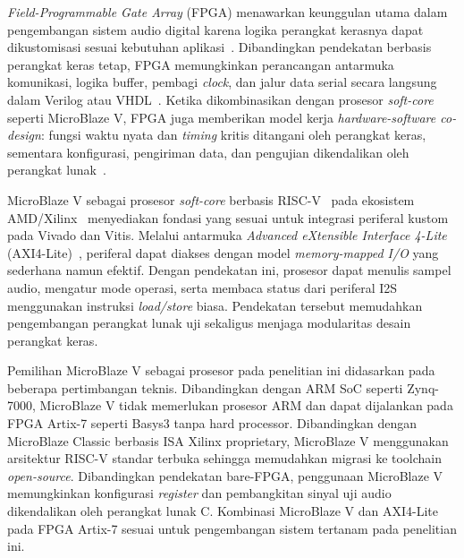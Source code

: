 \hspace{1cm}\textit{Field-Programmable Gate Array} (FPGA) menawarkan keunggulan utama dalam pengembangan sistem audio digital karena logika perangkat kerasnya dapat dikustomisasi sesuai kebutuhan aplikasi~\citep{trimberger_history_fpga_2018}. Dibandingkan pendekatan berbasis perangkat keras tetap, FPGA memungkinkan perancangan antarmuka komunikasi, logika buffer, pembagi \textit{clock}, dan jalur data serial secara langsung dalam Verilog atau VHDL~\citep{palnitkar_verilog_2003}. Ketika dikombinasikan dengan prosesor \textit{soft-core} seperti MicroBlaze V, FPGA juga memberikan model kerja \textit{hardware-software co-design}: fungsi waktu nyata dan \textit{timing} kritis ditangani oleh perangkat keras, sementara konfigurasi, pengiriman data, dan pengujian dikendalikan oleh perangkat lunak~\citep{crockett_zynq_book_2014}.

\hspace{1cm}MicroBlaze V sebagai prosesor \textit{soft-core} berbasis RISC-V~\citep{waterman_riscv_2016} pada ekosistem AMD/Xilinx~\citep{xilinx_microblaze_ref_2021} menyediakan fondasi yang sesuai untuk integrasi periferal kustom pada Vivado dan Vitis. Melalui antarmuka \textit{Advanced eXtensible Interface 4-Lite} (AXI4-Lite)~\citep{arm_amba_axi_2010}, periferal dapat diakses dengan model \textit{memory-mapped I/O} yang sederhana namun efektif. Dengan pendekatan ini, prosesor dapat menulis sampel audio, mengatur mode operasi, serta membaca status dari periferal I2S menggunakan instruksi \textit{load/store} biasa. Pendekatan tersebut memudahkan pengembangan perangkat lunak uji sekaligus menjaga modularitas desain perangkat keras.

\hspace{1cm}Pemilihan MicroBlaze V sebagai prosesor pada penelitian ini didasarkan pada beberapa pertimbangan teknis. Dibandingkan dengan ARM SoC seperti Zynq-7000, MicroBlaze V tidak memerlukan prosesor ARM dan dapat dijalankan pada FPGA Artix-7 seperti Basys3 tanpa hard processor. Dibandingkan dengan MicroBlaze Classic berbasis ISA Xilinx proprietary, MicroBlaze V menggunakan arsitektur RISC-V standar terbuka sehingga memudahkan migrasi ke toolchain \textit{open-source}. Dibandingkan pendekatan bare-FPGA, penggunaan MicroBlaze V memungkinkan konfigurasi \textit{register} dan pembangkitan sinyal uji audio dikendalikan oleh perangkat lunak C. Kombinasi MicroBlaze V dan AXI4-Lite pada FPGA Artix-7 sesuai untuk pengembangan sistem tertanam pada penelitian ini.

